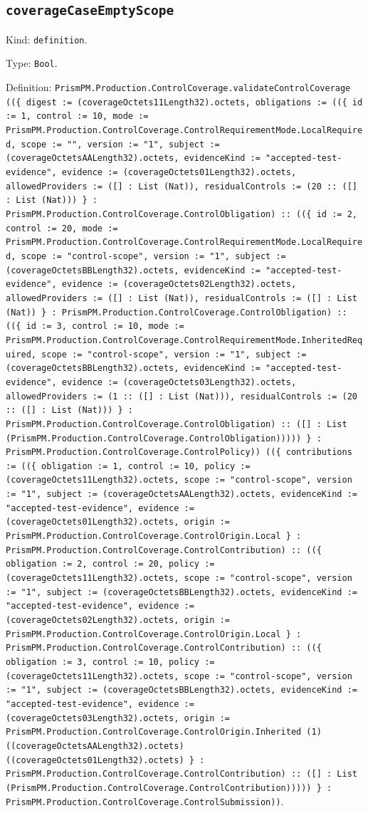 \documentclass[11pt]{article}
\begin{document}
\subsection*{\texttt{coverageCaseEmptyScope}}
\noindent Kind: \texttt{definition}.\par
\noindent Type: \texttt{Bool}.\par
\noindent Definition: \texttt{PrismPM.Production.ControlCoverage.validateControlCoverage ((\{ digest := (coverageOctets11Length32).octets, obligations := ((\{ id := 1, control := 10, mode := PrismPM.Production.ControlCoverage.ControlRequirementMode.LocalRequired, scope := "", version := "1", subject := (coverageOctetsAALength32).octets, evidenceKind := "accepted-test-evidence", evidence := (coverageOctets01Length32).octets, allowedProviders := ([] : List (Nat)), residualControls := (20 :: ([] : List (Nat))) \} : PrismPM.Production.ControlCoverage.ControlObligation) :: ((\{ id := 2, control := 20, mode := PrismPM.Production.ControlCoverage.ControlRequirementMode.LocalRequired, scope := "control-scope", version := "1", subject := (coverageOctetsBBLength32).octets, evidenceKind := "accepted-test-evidence", evidence := (coverageOctets02Length32).octets, allowedProviders := ([] : List (Nat)), residualControls := ([] : List (Nat)) \} : PrismPM.Production.ControlCoverage.ControlObligation) :: ((\{ id := 3, control := 10, mode := PrismPM.Production.ControlCoverage.ControlRequirementMode.InheritedRequired, scope := "control-scope", version := "1", subject := (coverageOctetsBBLength32).octets, evidenceKind := "accepted-test-evidence", evidence := (coverageOctets03Length32).octets, allowedProviders := (1 :: ([] : List (Nat))), residualControls := (20 :: ([] : List (Nat))) \} : PrismPM.Production.ControlCoverage.ControlObligation) :: ([] : List (PrismPM.Production.ControlCoverage.ControlObligation))))) \} : PrismPM.Production.ControlCoverage.ControlPolicy)) ((\{ contributions := ((\{ obligation := 1, control := 10, policy := (coverageOctets11Length32).octets, scope := "control-scope", version := "1", subject := (coverageOctetsAALength32).octets, evidenceKind := "accepted-test-evidence", evidence := (coverageOctets01Length32).octets, origin := PrismPM.Production.ControlCoverage.ControlOrigin.Local \} : PrismPM.Production.ControlCoverage.ControlContribution) :: ((\{ obligation := 2, control := 20, policy := (coverageOctets11Length32).octets, scope := "control-scope", version := "1", subject := (coverageOctetsBBLength32).octets, evidenceKind := "accepted-test-evidence", evidence := (coverageOctets02Length32).octets, origin := PrismPM.Production.ControlCoverage.ControlOrigin.Local \} : PrismPM.Production.ControlCoverage.ControlContribution) :: ((\{ obligation := 3, control := 10, policy := (coverageOctets11Length32).octets, scope := "control-scope", version := "1", subject := (coverageOctetsBBLength32).octets, evidenceKind := "accepted-test-evidence", evidence := (coverageOctets03Length32).octets, origin := PrismPM.Production.ControlCoverage.ControlOrigin.Inherited (1) ((coverageOctetsAALength32).octets) ((coverageOctets01Length32).octets) \} : PrismPM.Production.ControlCoverage.ControlContribution) :: ([] : List (PrismPM.Production.ControlCoverage.ControlContribution))))) \} : PrismPM.Production.ControlCoverage.ControlSubmission))}.\par
\end{document}
